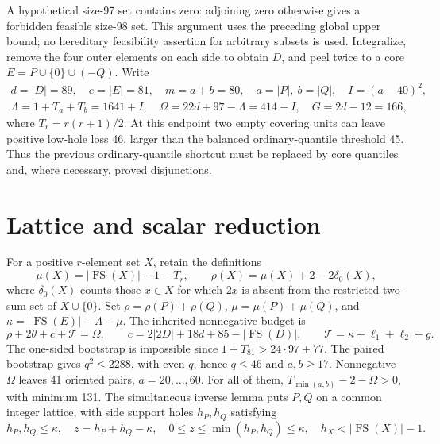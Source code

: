 \documentclass[11pt,a4paper]{article}
\newcommand{\FS}{\operatorname{FS}}
\newcommand{\T}{\mathcal T}
\begin{document}
A hypothetical size-97 set contains zero: adjoining zero otherwise gives
a forbidden feasible size-98 set. This argument uses the preceding global
upper bound; no hereditary feasibility assertion for arbitrary subsets
is used. Integralize, remove the four outer elements on each side to
obtain $D$, and peel twice to a core
$E=P\cup\{0\}\cup(-Q)$. Write
\begin{gather*}
 d=|D|=89,\quad e=|E|=81,\quad m=a+b=80,\quad
 a=|P|,\ b=|Q|,\quad I=(a-40)^2,\\
 \Lambda=1+T_a+T_b=1641+I,\quad
 \Omega=22d+97-\Lambda=414-I,\quad G=2d-12=166,
\end{gather*}
where $T_r=r(r+1)/2$.
At this endpoint two empty covering units can leave positive low-hole
loss 46, larger than the balanced ordinary-quantile threshold 45.
Thus the previous ordinary-quantile shortcut must be replaced by core
quantiles and, where necessary, proved disjunctions.

\section{Lattice and scalar reduction}
For a positive $r$-element set $X$, retain the definitions
\[
 \mu(X)=|\FS(X)|-1-T_r,\qquad
 \rho(X)=\mu(X)+2-2\delta_0(X),
\]
where $\delta_0(X)$ counts those $x\in X$ for which $2x$ is absent from
the restricted two-sum set of $X\cup\{0\}$.
Set $\rho=\rho(P)+\rho(Q)$, $\mu=\mu(P)+\mu(Q)$, and
$\kappa=|\FS(E)|-\Lambda-\mu$. The inherited nonnegative budget is
\begin{equation}\label{eq:budget}
 \rho+2\theta+c+\T=\Omega,\qquad
 c=2|2D|+18d+85-|\FS(D)|,\qquad
 \T=\kappa+\ell_1+\ell_2+g.
\end{equation}
The one-sided bootstrap is impossible since $1+T_{81}>24\cdot97+77$.
The paired bootstrap gives $q^2\le2288$, with even $q$, hence $q\le46$
and $a,b\ge17$. Nonnegative $\Omega$ leaves 41 oriented pairs,
$a=20,\ldots,60$. For all of them,
$T_{\min(a,b)}-2-\Omega>0$, with minimum 131. The simultaneous inverse
lemma puts $P,Q$ on a common integer lattice, with side support holes
$h_P,h_Q$ satisfying
\begin{equation}\label{eq:holes}
 h_P,h_Q\le\kappa,\quad z=h_P+h_Q-\kappa,
 \quad0\le z\le\min(h_P,h_Q)\le\kappa,
 \quad h_X<|\FS(X)|-1.
\end{equation}
\end{document}
